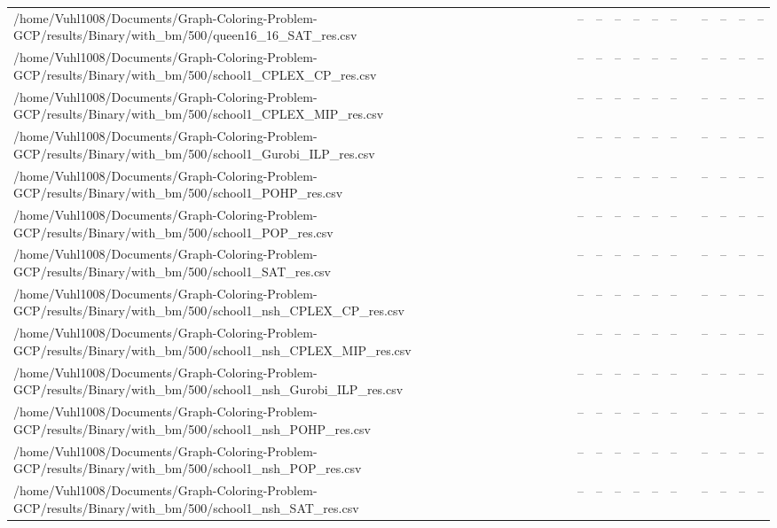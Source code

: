 \begin{table}[htbp]
\begin{tabular}{llllllllllll}
/home/Vuhl1008/Documents/Graph-Coloring-Problem-GCP/results/Binary/with\_bm/500/queen16\_16\_SAT\_res.csv & -- & -- & -- & -- & -- & -- & {} & -- & -- & -- & -- \\
/home/Vuhl1008/Documents/Graph-Coloring-Problem-GCP/results/Binary/with\_bm/500/school1\_CPLEX\_CP\_res.csv & -- & -- & -- & -- & -- & -- & {} & -- & -- & -- & -- \\
/home/Vuhl1008/Documents/Graph-Coloring-Problem-GCP/results/Binary/with\_bm/500/school1\_CPLEX\_MIP\_res.csv & -- & -- & -- & -- & -- & -- & {} & -- & -- & -- & -- \\
/home/Vuhl1008/Documents/Graph-Coloring-Problem-GCP/results/Binary/with\_bm/500/school1\_Gurobi\_ILP\_res.csv & -- & -- & -- & -- & -- & -- & {} & -- & -- & -- & -- \\
/home/Vuhl1008/Documents/Graph-Coloring-Problem-GCP/results/Binary/with\_bm/500/school1\_POHP\_res.csv & -- & -- & -- & -- & -- & -- & {} & -- & -- & -- & -- \\
/home/Vuhl1008/Documents/Graph-Coloring-Problem-GCP/results/Binary/with\_bm/500/school1\_POP\_res.csv & -- & -- & -- & -- & -- & -- & {} & -- & -- & -- & -- \\
/home/Vuhl1008/Documents/Graph-Coloring-Problem-GCP/results/Binary/with\_bm/500/school1\_SAT\_res.csv & -- & -- & -- & -- & -- & -- & {} & -- & -- & -- & -- \\
/home/Vuhl1008/Documents/Graph-Coloring-Problem-GCP/results/Binary/with\_bm/500/school1\_nsh\_CPLEX\_CP\_res.csv & -- & -- & -- & -- & -- & -- & {} & -- & -- & -- & -- \\
/home/Vuhl1008/Documents/Graph-Coloring-Problem-GCP/results/Binary/with\_bm/500/school1\_nsh\_CPLEX\_MIP\_res.csv & -- & -- & -- & -- & -- & -- & {} & -- & -- & -- & -- \\
/home/Vuhl1008/Documents/Graph-Coloring-Problem-GCP/results/Binary/with\_bm/500/school1\_nsh\_Gurobi\_ILP\_res.csv & -- & -- & -- & -- & -- & -- & {} & -- & -- & -- & -- \\
/home/Vuhl1008/Documents/Graph-Coloring-Problem-GCP/results/Binary/with\_bm/500/school1\_nsh\_POHP\_res.csv & -- & -- & -- & -- & -- & -- & {} & -- & -- & -- & -- \\
/home/Vuhl1008/Documents/Graph-Coloring-Problem-GCP/results/Binary/with\_bm/500/school1\_nsh\_POP\_res.csv & -- & -- & -- & -- & -- & -- & {} & -- & -- & -- & -- \\
/home/Vuhl1008/Documents/Graph-Coloring-Problem-GCP/results/Binary/with\_bm/500/school1\_nsh\_SAT\_res.csv & -- & -- & -- & -- & -- & -- & {} & -- & -- & -- & -- \\

\end{tabular}
\end{table}
